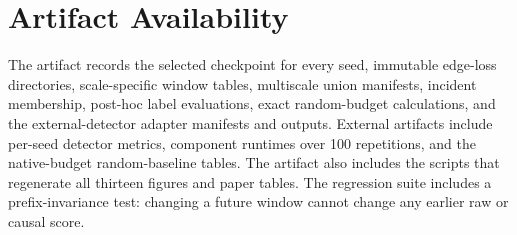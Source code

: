 \documentclass[lettersize,journal]{IEEEtran}
\begin{document}
\section*{Artifact Availability}

The artifact records the selected checkpoint for every seed, immutable edge-loss
directories, scale-specific window tables, multiscale union manifests, incident
membership, post-hoc label evaluations, exact random-budget calculations, and
the external-detector adapter manifests and outputs.  External artifacts include
per-seed detector metrics, component runtimes over 100 repetitions, and the
native-budget random-baseline tables.  The artifact also includes the scripts
that regenerate all thirteen figures and paper tables.  The regression suite
includes a prefix-invariance test: changing a future window cannot change any
earlier raw or causal score.
\end{document}
